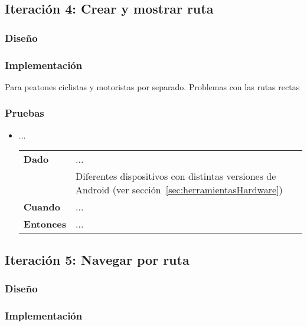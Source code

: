 \subsection{Iteración 4: Crear y mostrar ruta}
\subsubsection{Diseño}
\subsubsection{Implementación}
Para peatones ciclistas y motoristas por separado.
Problemas con las rutas rectas
\begin{listing}[
  float=ht,
  language = java,
  caption  = {},
  label    = code:]

\end{listing}
\subsubsection{Pruebas}
\begin{itemize}
  \item ...

  \begin{tabular}{p{}p{}}
    \hline
    \textbf{Dado}     & ... \\
                      & Diferentes dispositivos con distintas versiones de Android (ver
                        sección~\ref{sec:herramientasHardware}) \\
    \textbf{Cuando}   & ... \\
    \textbf{Entonces} & ... \\
    \hline
  \end{tabular}
\end{itemize}

\subsection{Iteración 5: Navegar por ruta}
\subsubsection{Diseño}
\subsubsection{Implementación}
\begin{listing}[
  float=ht,
  language = java,
  caption  = {},
  label    = code:]

\end{listing}
